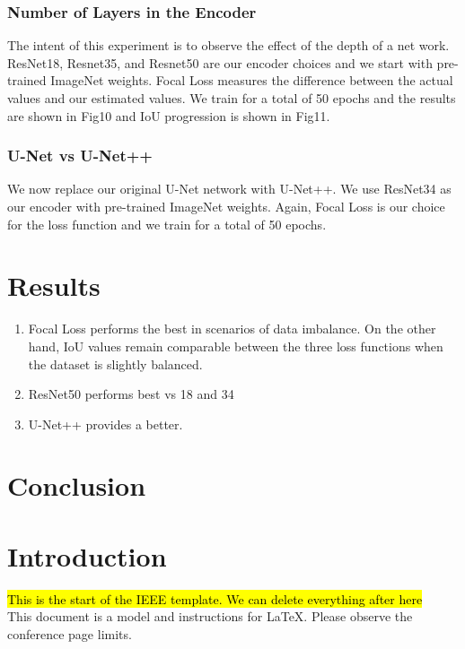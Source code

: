 \documentclass[conference]{IEEEtran}
\begin{document}
\subsubsection{Number of Layers in the Encoder} The intent of this experiment is to observe the effect of the depth of a net work. ResNet18, Resnet35, and Resnet50 are our encoder choices and we start with pre-trained ImageNet weights. Focal Loss measures the difference between the actual values and our estimated values. We train for a total of 50 epochs and the results are shown in Fig10 and IoU progression is shown in Fig11.

\subsubsection{U-Net vs U-Net++} We now replace our original U-Net network with U-Net++. We use ResNet34 as our encoder with pre-trained ImageNet weights. Again, Focal Loss is our choice for the loss function and we train for a total of 50 epochs. 


\section{Results}
\begin{enumerate}
    \item Focal Loss performs the best in scenarios of data imbalance. On the other hand, IoU values remain comparable between the three loss functions when the dataset is slightly balanced.
    \item ResNet50 performs best vs 18 and 34
    \item U-Net++ provides a better.
\end{enumerate}
\section{Conclusion}




\newpage
\section{Introduction}
\hl{This is the start of the IEEE template. We can delete everything after here} \\
This document is a model and instructions for \LaTeX.
Please observe the conference page limits. 
\end{document}

